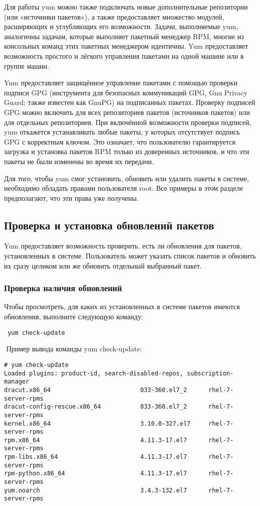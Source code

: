 \documentclass[a4paper,10pt,twoside]{article}
\begin{document}
Для работы yum можно также подключать новые дополнительные репозитории (или «источники пакетов»), а также предоставляет множество модулей, расширяющих и углубляющих его возможности. Задачи, выполняемые yum, аналогичны задачам, которые выполняет пакетный менеджер RPM, многие из консольных команд этих пакетных менеджером идентичны. Yum предоставляет возможность простого и лёгкого управления пакетами на одной машине или в группе машин.

Yum предоставляет защищённое управление пакетами с помощью проверки подписи GPG (инструмента для безопасных коммуникаций GPG, Gnu Privacy Guard; также известен как GnuPG) на подписанных пакетах. Проверку подписей GPG можно включить для всех репозиториев  пакетов (источников пакетов) или для отдельных репозиториев. При включённой возможности проверки подписей, yum откажется устанавливать любые пакеты, у которых отсутствует подпись GPG с корректным ключом. Это означает, что пользователю гарантируется загрузка и установка пакетов RPM только из доверенных источников, и что эти пакеты не были изменены во время их передачи.



Для того, чтобы yum смог установить, обновить или удалить пакеты в системе, необходимо обладать правами пользователя root. Все примеры в этом разделе предполагают, что эти права уже получены.



\subsection{Проверка и установка обновлений пакетов}
Yum предоставляет возможность проверить, есть ли обновления для пакетов, установленных в системе. Пользователь может указать список пакетов и обновить их сразу целиком или же обновить отдельный выбранный пакет.


\subsubsection{Проверка наличия обновлений}
Чтобы просмотреть, для каких из установленных в системе пакетов имеются обновления, выполните следующую команду:
\begin{verbatim}
 yum check-update
\end{verbatim} 
⁠
Пример вывода команды yum check-update:
\begin{verbatim}
# yum check-update
Loaded plugins: product-id, search-disabled-repos, subscription-manager
dracut.x86_64                         033-360.el7_2      rhel-7-server-rpms
dracut-config-rescue.x86_64           033-360.el7_2      rhel-7-server-rpms
kernel.x86_64                         3.10.0-327.el7     rhel-7-server-rpms
rpm.x86_64                            4.11.3-17.el7      rhel-7-server-rpms
rpm-libs.x86_64                       4.11.3-17.el7      rhel-7-server-rpms
rpm-python.x86_64                     4.11.3-17.el7      rhel-7-server-rpms
yum.noarch                            3.4.3-132.el7      rhel-7-server-rpms
\end{verbatim} 
\end{document}
